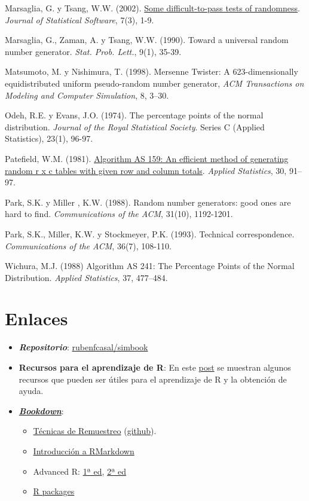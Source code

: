 \documentclass[
]{book}
\theoremstyle{break}
\theoremstyle{nonumberplain}
\begin{document}
Marsaglia, G. y Tsang, W.W. (2002). \href{http://www.jstatsoft.org/v07/i03}{Some difficult-to-pass tests of randomness}. \emph{Journal of Statistical Software}, 7(3), 1-9.

Marsaglia, G., Zaman, A. y Tsang, W.W. (1990). Toward a universal random number generator. \emph{Stat. Prob. Lett.}, 9(1), 35-39.

Matsumoto, M. y Nishimura, T. (1998). Mersenne Twister: A 623-dimensionally equidistributed uniform pseudo-random number generator, \emph{ACM Transactions on Modeling and Computer Simulation}, 8, 3--30.

Odeh, R.E. y Evans, J.O. (1974). The percentage points of the normal distribution. \emph{Journal of the Royal Statistical Society}. Series C (Applied Statistics), 23(1), 96-97.

Patefield, W.M. (1981). \href{https://doi.org/10.2307/2346669}{Algorithm AS 159: An efficient method of generating random r x c tables with given row and column totals}. \emph{Applied Statistics}, 30, 91--97.

Park, S.K. y Miller , K.W. (1988). Random number generators: good ones are hard to find. \emph{Communications of the ACM}, 31(10), 1192-1201.

Park, S.K., Miller, K.W. y Stockmeyer, P.K. (1993). Technical correspondence. \emph{Communications of the ACM}, 36(7), 108-110.

Wichura, M.J. (1988) Algorithm AS 241: The Percentage Points of the Normal Distribution. \emph{Applied Statistics}, 37, 477--484.

\hypertarget{appendix-apendices}{%
\appendix}


\hypertarget{links}{%
\chapter{Enlaces}\label{links}}

\begin{itemize}
\item
  \textbf{\emph{Repositorio}}: \href{https://github.com/rubenfcasal/simbook}{rubenfcasal/simbook}
\item
  \textbf{Recursos para el aprendizaje de R}: En este \href{https://rubenfcasal.github.io/post/ayuda-y-recursos-para-el-aprendizaje-de-r}{post} se muestran algunos recursos que pueden ser útiles para el aprendizaje de R y la obtención de ayuda.
\item
  \href{https://bookdown.org}{\textbf{\emph{Bookdown}}}:

  \begin{itemize}
  \item
    \href{https://rubenfcasal.github.io/book_remuestreo}{Técnicas de Remuestreo}
    (\href{https://github.com/rubenfcasal/book_remuestreo}{github}).
  \item
    \href{https://rubenfcasal.github.io/bookdown_intro/rmarkdown.html}{Introducción a RMarkdown}
  \item
    Advanced R:
    \href{http://adv-r.had.co.nz/}{1ª ed},
    \href{https://adv-r.hadley.nz/}{2ª ed}
  \item
    \href{http://r-pkgs.had.co.nz/}{R packages}
  \end{itemize}
\end{itemize}
\end{document}
